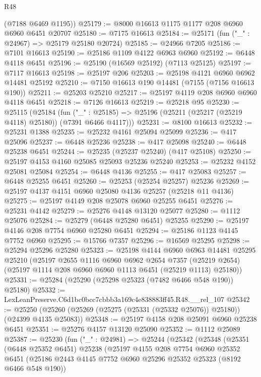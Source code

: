 \begin{lexlean}{R48}
\begin{coremodule}
      (@7188 @6469 @1195))
@25179 := @8000 @16613 @1175 @1177 @208 @6960 @6960 @6451 @20707
@25180 := @7175 @16613
@25184 := @25171 (fun ("_" : @24967) => @25179 @25180 @20724)
@25185 := @24966 @7205
@25186 := @7101 @16613
@25190 := @25186 @1109 @4122 @6963 @6960
@25192 := @6448 @4118 @6451
@25196 := @25190 (@16569 @25192) (@7113 @25125)
@25197 := @7117 @16613
@25198 := @25197 @206
@25203 := @25198 @4121 @6960 @6962 @14481 @25192
@25210 := @7150 @16613 @190 @14481 (@7155 (@7156 @16613 @190))
@25211 := @25203 @25210
@25217 := @25197 @4119 @208 @6960 @6960 @4118 @6451
@25218 := @7126 @16613
@25219 := @25218 @95
@25230 := @25115
    (@25184
      (fun ("_" : @25185) => @25196 (@25211 (@25217 (@25219 @4118) @25180)) (@7391 @6466 @4117)))
@25231 := @8100 @16613
@25232 := @25231 @1388
@25235 := @25232 @4161 @25094 @25099
@25236 := @417 @25096
@25237 := @6448 @25236
@25238 := @417 @25098
@25240 := @6448 @25238 @6451
@25244 := @25235 (@25237 @25240) (@417 @25108)
@25250 := @25197 @4153 @4160 @25085 @25093 @25236 @25240
@25253 := @25232 @4152 @25081 @25084
@25254 := @6448 @4136
@25255 := @417 @25083
@25257 := @6448 @25255 @6451
@25260 := @25253 (@25254 @25257) @25236
@25269 := @25197 @4137 @4151 @6960 @25080 @4136 @25257 (@25218 @11 @4136)
@25275 := @25197 @4149 @208 @25078 @6960 @25255 @6451
@25276 := @25231 @4142
@25279 := @25276 @4148 @13120 @25077
@25280 := @1112 @25076
@25284 := @25279 (@6448 @25280 @6451) @25255
@25290 := @25197 @4146 @208 @7754 @6960 @25280 @6451
@25294 := @25186 @1123 @4145 @7752 @6960
@25295 := @15766 @7357
@25296 := @16569 @25295
@25298 := @25294 @25296 @25280
@25323 := @25198
    @4144
    @6960
    @6963
    @14481
    @25295
    @25210
    (@25197
      @2655
      @1116
      @6960
      @6962
      @2654
      @7357
      (@25219 @2654)
      (@25197 @1114 @208 @6960 @6960 @1113 @6451 (@25219 @1113) @25180))
@25331 := @25284 (@25290 (@25298 @25323 (@7482 @6466 @548 @190)) @25180)
@25332 := LexLeanPreserve.C6d1bc0bcc7cbbb3a169c4e838883ff45.R48.__rel_107
@25342 := @25250 (@25260 (@25269 (@25275 (@25331 (@25332 @25076)) @25180)) (@24399 @4135 @25083))
@25348 := @25197 @4158 @208 @25091 @6960 @25238 @6451
@25351 := @25276 @4157 @13120 @25090
@25352 := @1112 @25089
@25387 := @25230
    (fun ("_" : @24981) =>
    @25244
      (@25342
        (@25348
          (@25351
            (@6448 @25352 @6451)
            @25238
            (@25197
              @4155
              @208
              @7754
              @6960
              @25352
              @6451
              (@25186 @2443 @4145 @7752 @6960 @25296 @25352 @25323 (@8192 @6466 @548 @190))

\end{coremodule}
\end{lexlean}
